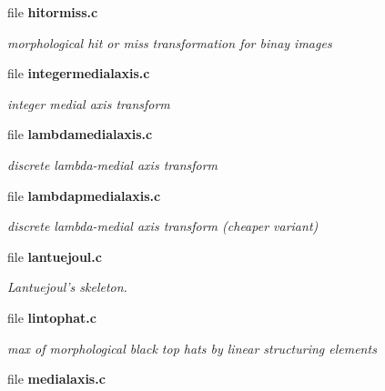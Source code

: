 \begin{DoxyCompactItemize}
\item 
file {\bf hitormiss.c}


\begin{DoxyCompactList}\small\item\em morphological hit or miss transformation for binay images \item\end{DoxyCompactList}

\item 
file {\bf integermedialaxis.c}


\begin{DoxyCompactList}\small\item\em integer medial axis transform \item\end{DoxyCompactList}

\item 
file {\bf lambdamedialaxis.c}


\begin{DoxyCompactList}\small\item\em discrete lambda-\/medial axis transform \item\end{DoxyCompactList}

\item 
file {\bf lambdapmedialaxis.c}


\begin{DoxyCompactList}\small\item\em discrete lambda-\/medial axis transform (cheaper variant) \item\end{DoxyCompactList}

\item 
file {\bf lantuejoul.c}


\begin{DoxyCompactList}\small\item\em Lantuejoul's skeleton. \item\end{DoxyCompactList}

\item 
file {\bf lintophat.c}


\begin{DoxyCompactList}\small\item\em max of morphological black top hats by linear structuring elements \item\end{DoxyCompactList}

\item 
file {\bf medialaxis.c}



\end{DoxyCompactItemize}
